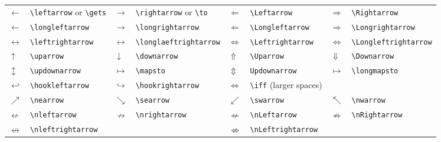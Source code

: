 \documentclass[10pt, english]{article}
\begin{document}
	\begin{center}
		\scriptsize
	\begin{tabular}{ll|ll|ll|ll}
		$\leftarrow$ & \verb|\leftarrow| or \verb|\gets| & $\rightarrow$ & \verb|\rightarrow| or \verb|\to| & $\Leftarrow$ & \verb|\Leftarrow| & $\Rightarrow$ & \verb|\Rightarrow| \\
		$\longleftarrow$ & \verb|\longleftarrow| & $\longrightarrow$ & \verb|\longrightarrow| & $\Longleftarrow$ & \verb|\Longleftarrow| & $\Longrightarrow$ & \verb|\Longrightarrow| \\
		$\leftrightarrow$ & \verb|\leftrightarrow| & $\longleftrightarrow$ & \verb|\longlaeftrightarrow| & $\Leftrightarrow$ & \verb|\Leftrightarrow| & $\Longleftrightarrow$ & \verb|\Longleftrightarrow| \\
		$\uparrow$ & \verb|\uparrow| & $\downarrow$ & \verb|\downarrow| & $\Uparrow$ & \verb|\Uparrow| & $\Downarrow$ & \verb|\Downarrow| \\
		$\updownarrow$ & \verb|\updownarrow| & $\mapsto$ & \verb|\mapsto| & $\Updownarrow$ & \verb|Updownarrow| & $\longmapsto$ & \verb|\longmapsto| \\
		$\hookleftarrow$ & \verb|\hookleftarrow| & $\hookrightarrow$ & \verb|\hookrightarrow| & $\iff$ & \verb|\iff| (larger spaces) \\ 
		$\nearrow$ & \verb|\nearrow| & $\searrow$ & \verb|\searrow| & $\swarrow$ & \verb|\swarrow| & $\nwarrow$ & \verb|\nwarrow| \\
		$\nleftarrow$ & \verb|\nleftarrow| & $\nrightarrow$ & \verb|\nrightarrow| & $\nLeftarrow$ & \verb|\nLeftarrow| & $\nRightarrow$ & \verb|\nRightarrow|\\
		$\nleftrightarrow$ & \verb|\nleftrightarrow| & & & $\nLeftrightarrow$ & \verb|\nLeftrightarrow|
	\end{tabular}
	\end{center}
\end{document}
